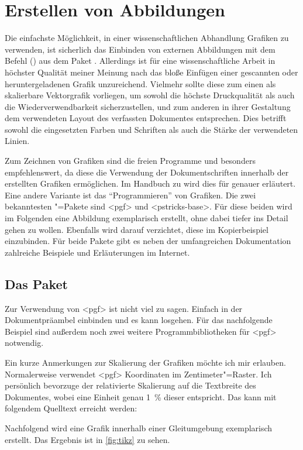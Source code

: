 \documentclass[%
  english,ngerman,%
  cdgeometry=no,DIV=12,automark,%
]{tudscrartcl}
\begin{document}
\section{Erstellen von Abbildungen}
\label{sec:figures}%
%
Die einfachste Möglichkeit, in einer wissenschaftlichen Abhandlung Grafiken zu 
verwenden, ist sicherlich das Einbinden von externen Abbildungen mit dem Befehl 
() aus dem Paket . 
Allerdings ist für eine wissenschaftliche Arbeit in höchster Qualität meiner 
Meinung nach das bloße Einfügen einer gescannten oder heruntergeladenen Grafik 
unzureichend. Vielmehr sollte diese zum einen als skalierbare Vektorgrafik 
vorliegen, um sowohl die höchste Druckqualität als auch die 
Wiederverwendbarkeit sicherzustellen, und zum anderen in ihrer Gestaltung dem 
verwendeten Layout des verfassten Dokumentes entsprechen. Dies betrifft sowohl 
die eingesetzten Farben und Schriften als auch die Stärke der verwendeten 
Linien.

Zum Zeichnen von Grafiken sind die freien Programme  und 
besonders  empfehlenswert, da diese die Verwendung der 
Dokumentschriften innerhalb der erstellten Grafiken ermöglichen. Im Handbuch zu 
\TUDScript wird dies für  
genauer erläutert. Eine andere Variante ist das \enquote{Programmieren} von 
Grafiken. Die zwei bekanntesten "=Pakete sind <pgf> 
und <pstricks-base>. Für diese beiden wird im Folgenden eine 
Abbildung exemplarisch erstellt, ohne dabei tiefer ins Detail gehen zu wollen. 
Ebenfalls wird darauf verzichtet, diese im Kopierbeispiel einzubinden. Für 
beide Pakete gibt es neben der umfangreichen Dokumentation zahlreiche Beispiele 
und Erläuterungen im Internet.


\subsection{Das Paket }
Zur Verwendung von <pgf> ist nicht viel zu sagen. Einfach in der 
Dokumentpräambel einbinden und es kann losgehen. Für das nachfolgende Beispiel 
sind außerdem noch zwei weitere Programmbibliotheken für <pgf> 
notwendig.
%
\begin{Hint}
\usepackage{tikz}
\usetikzlibrary{chains}
\usetikzlibrary{decorations.markings}
\tikzset{on grid}
\end{Hint}
%
Ein kurze Anmerkungen zur Skalierung der Grafiken möchte ich mir erlauben. 
Normalerweise verwendet <pgf> Koordinaten im Zentimeter"=Raster. 
Ich persönlich bevorzuge der relativierte Skalierung auf die Textbreite des 
Dokumentes, wobei eine Einheit genau \SI{1}{\percent} dieser entspricht. Das 
kann mit folgendem Quelltext erreicht werden:
%
\CodeHook{\renewcommand\newlength[1]{}}
\begin{Hint*}
\newlength{\tikzunit}
\setlength{\tikzunit}{.01\textwidth}
\tikzset{x=\tikzunit,y=\tikzunit}
\end{Hint*}
%
Nachfolgend wird eine Grafik innerhalb einer Gleitumgebung exemplarisch 
erstellt. Das Ergebnis ist in \autoref{fig:tikz} zu sehen.
\end{document}
